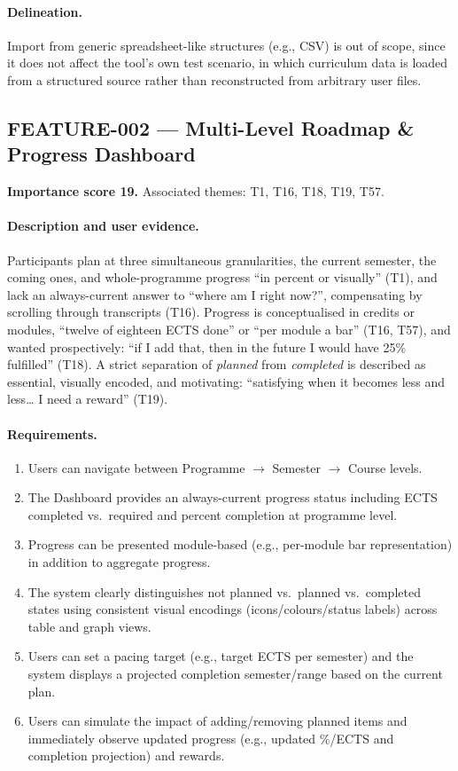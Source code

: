 \paragraph{Delineation.}
Import from generic spreadsheet-like structures (e.g., CSV) is out of scope, since it does not affect the tool's own test scenario, in which curriculum data is loaded from a structured source rather than reconstructed from arbitrary user files.

\subsection{FEATURE-002 --- Multi-Level Roadmap \& Progress Dashboard}
\label{feat:002}
\textbf{Importance score 19.} Associated themes: T1, T16, T18, T19, T57.

\paragraph{Description and user evidence.}
Participants plan at three simultaneous granularities, the current semester, the coming ones, and whole-programme progress \enquote{in percent or visually} (T1), and lack an always-current answer to \enquote{where am I right now?}, compensating by scrolling through transcripts (T16). Progress is conceptualised in credits or modules, \enquote{twelve of eighteen ECTS done} or \enquote{per module a bar} (T16, T57), and wanted prospectively: \enquote{if I add that, then in the future I would have 25\% fulfilled} (T18). A strict separation of \emph{planned} from \emph{completed} is described as essential, visually encoded, and motivating: \enquote{satisfying when it becomes less and less… I need a reward} (T19).

\paragraph{Requirements.}
\begin{enumerate}
    \item Users can navigate between Programme $\to$ Semester $\to$ Course levels.
    \item The Dashboard provides an always-current progress status including ECTS completed vs.\ required and percent completion at programme level.
    \item Progress can be presented module-based (e.g., per-module bar representation) in addition to aggregate progress.
    \item The system clearly distinguishes not planned vs.\ planned vs.\ completed states using consistent visual encodings (icons/colours/status labels) across table and graph views.
    \item Users can set a pacing target (e.g., target ECTS per semester) and the system displays a projected completion semester/range based on the current plan.
    \item Users can simulate the impact of adding/removing planned items and immediately observe updated progress (e.g., updated \%/ECTS and completion projection) and rewards.
\end{enumerate}

